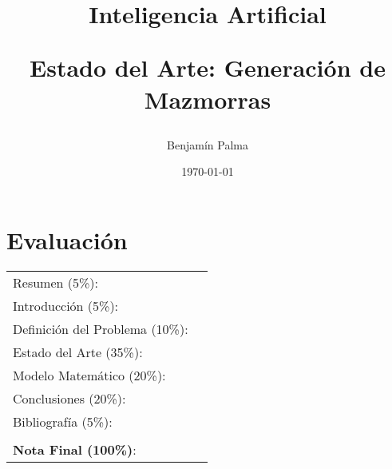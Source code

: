 \documentclass[letter, 10pt]{article}
\begin{document}
\title{Inteligencia Artificial \\ \begin{Large}Estado del Arte: Generaci\'on de Mazmorras\end{Large}}
\author{Benjam\'in Palma}
\date{\today}
\maketitle


\section*{Evaluaci\'on}

\begin{tabular}{ll}
Resumen (5\%): & \underline{\hspace{2cm}} \\
Introducci\'on (5\%): & \underline{\hspace{2cm}} \\
Definici\'on del Problema (10\%): & \underline{\hspace{2cm}} \\
Estado del Arte (35\%): & \underline{\hspace{2cm}} \\
Modelo Matem\'atico (20\%): & \underline{\hspace{2cm}}\\
Conclusiones (20\%): & \underline{\hspace{2cm}}\\
Bibliograf\'ia (5\%): & \underline{\hspace{2cm}}\\
 & \\
\textbf{Nota Final (100\%)}:  & \underline{\hspace{2cm}}
\end{tabular}
\vspace{2cm}
\end{document}

